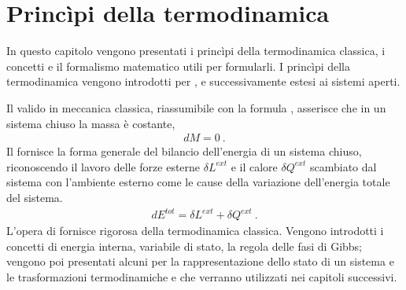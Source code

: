 \documentclass[letterpaper,10pt,italian]{jupyterBook}
\begin{document}
\sphinxstepscope


\chapter{Princìpi della termodinamica}
\label{\detokenize{ch/thermodynamics/principles:principi-della-termodinamica}}\label{\detokenize{ch/thermodynamics/principles:physics-hs-thermodynamics-principles}}\label{\detokenize{ch/thermodynamics/principles::doc}}
\sphinxAtStartPar
In questo capitolo vengono presentati i princìpi della termodinamica classica, i concetti e il formalismo matematico utili per formularli.
I princìpi della termodinamica vengono introdotti per , e successivamente estesi ai sistemi aperti.



\sphinxAtStartPar
Il {\hyperref[\detokenize{ch/thermodynamics/principles-lavoisier:physics-hs-thermodynamics-foundation-principles-lavoisier}]{}} valido in meccanica classica, riassumibile con la formula , asserisce che in un sistema chiuso la massa è costante,
\begin{equation*}
\begin{split}d M = 0 \ .\end{split}
\end{equation*}
\sphinxAtStartPar
Il {\hyperref[\detokenize{ch/thermodynamics/principles-first:physics-hs-thermodynamics-foundation-principles-first}]{}} fornisce la forma generale del bilancio dell’energia  di un sistema chiuso, riconoscendo il lavoro delle forze esterne \(\delta L^{ext}\) e il calore \(\delta Q^{ext}\) scambiato dal sistema con l’ambiente esterno come le cause della variazione dell’energia totale del sistema.
\begin{equation*}
\begin{split}d E^{tot} = \delta L^{ext} + \delta Q^{ext} \ .\end{split}
\end{equation*}
\sphinxAtStartPar
L’opera di  fornisce {\hyperref[\detokenize{ch/thermodynamics/principles-gibbs-phase-rule:physics-hs-thermodynamics-foundation-principles-gibbs-phase-rule}]{}} rigorosa della termodinamica classica. Vengono introdotti i concetti di energia interna, variabile di stato, la regola delle fasi di Gibbs; vengono poi presentati alcuni {\hyperref[\detokenize{ch/thermodynamics/principles-phase-diagrams:physics-hs-thermodynamics-foundation-principles-phase-diagrams}]{}} per la rappresentazione dello stato di un sistema e le trasformazioni termodinamiche e che verranno utilizzati nei capitoli successivi.
\end{document}

